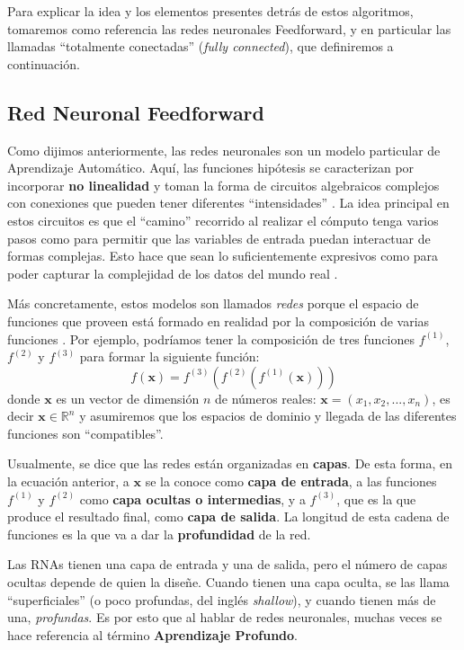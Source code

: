 \documentclass[../../main.tex]{subfiles}
\begin{document}
Para explicar la idea y los elementos presentes detrás de estos algoritmos, tomaremos como
referencia las redes neuronales Feedforward, y en particular las llamadas ``totalmente
conectadas'' (\textit{fully connected}), que definiremos a continuación.

\subsection{Red Neuronal Feedforward}
Como dijimos anteriormente, las redes neuronales son un modelo particular de Aprendizaje
Automático. Aquí, las funciones hipótesis se caracterizan por incorporar \textbf{no
linealidad} y toman la forma de circuitos algebraicos complejos con conexiones que pueden
tener diferentes ``intensidades'' \cite{ai-a-modern-approach}. La idea principal en estos
circuitos es que el ``camino'' recorrido al realizar el cómputo tenga varios pasos como
para permitir que las variables de entrada puedan interactuar de formas complejas. Esto
hace que sean lo suficientemente expresivos como para poder capturar la complejidad de los
datos del mundo real \cite{ai-a-modern-approach}.

Más concretamente, estos modelos son llamados \textit{redes} porque el espacio de
funciones que proveen está formado en realidad por la composición de varias funciones
\cite{deep-learning}. Por ejemplo, podríamos tener la composición de tres funciones
\(f^{(1)}\), \(f^{(2)}\) y \(f^{(3)}\) para formar la siguiente función:
\begin{equation}
    f(\bm{x}) = f^{(3)}(f^{(2)}(f^{(1)}(\bm{x})))
    \label{eq:fun-composition}
\end{equation}
donde \(\bm{x}\) es un vector de dimensión \(n\) de números reales: \(\bm{x}=(x_1,
x_2, ..., x_n)\), es decir \(\bm{x} \in \mathbb{R}^n\) y asumiremos que los espacios
de dominio y llegada de las diferentes funciones son ``compatibles''.

Usualmente, se dice que las redes están organizadas en \textbf{capas}. De esta forma, en
la ecuación anterior, a \(\bm{x}\) se la conoce como \textbf{capa de entrada}, a las
funciones \(f^{(1)}\) y \(f^{(2)}\) como \textbf{capa ocultas o intermedias}, y a
\(f^{(3)}\), que es la que produce el resultado final, como \textbf{capa de salida}. La
longitud de esta cadena de funciones es la que va a dar la \textbf{profundidad} de la red.

Las RNAs tienen una capa de entrada y una de salida, pero el número de capas ocultas
depende de quien la diseñe. Cuando tienen una capa oculta, se las llama ``superficiales''
(o poco profundas, del inglés \textit{shallow}), y cuando tienen más de una,
\textit{profundas}. Es por esto que al hablar de redes neuronales, muchas veces se
hace referencia al término \textbf{Aprendizaje Profundo}.
\end{document}
